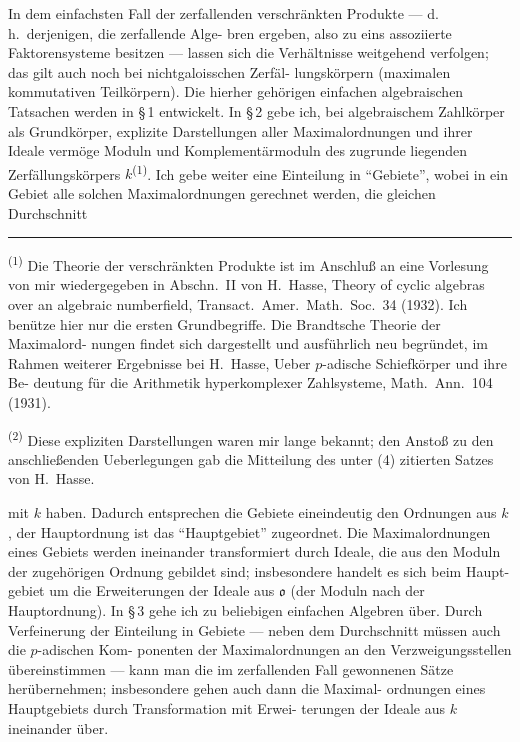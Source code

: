 \documentclass[12pt,a4paper]{article}
\theoremstyle{plain}
\begin{document}
\medskip

In dem einfachsten Fall der zerfallenden verschr\"ankten
Produkte --- d.\,h.\ derjenigen, die zerfallende Alge-
bren ergeben, also zu eins assoziierte Faktorensysteme
besitzen --- lassen sich die Verh\"altnisse weitgehend
verfolgen; das gilt auch noch bei nichtgaloisschen Zerf\"al-
lungsk\"orpern (maximalen kommutativen Teilk\"orpern). Die hierher
geh\"origen einfachen algebraischen Tatsachen werden in \S\,1
entwickelt. In \S\,2 gebe ich, bei algebraischem Zahlk\"orper als
Grundk\"orper, explizite Darstellungen aller Maximalordnungen und
ihrer Ideale verm\"oge Moduln und Komplement\"armoduln des
zugrunde liegenden Zerf\"allungsk\"orpers $k$\textsuperscript{(1)}. Ich gebe weiter eine
Einteilung in ``Gebiete'', wobei in ein Gebiet alle solchen
Maximalordnungen gerechnet werden, die gleichen Durchschnitt

\bigskip
\noindent\rule{0.3\textwidth}{0.4pt}

{\small
\textsuperscript{(1)} Die Theorie der verschr\"ankten Produkte ist im Anschlu\ss{} an eine Vorlesung
von mir wiedergegeben in Abschn.\ II von H.~Hasse, Theory of cyclic algebras
over an algebraic numberfield, Transact.\ Amer.\ Math.\ Soc.\ 34 (1932). Ich ben\"utze
hier nur die ersten Grundbegriffe. Die Brandtsche Theorie der Maximalord-
nungen findet sich dargestellt und ausf\"uhrlich neu begr\"undet, im Rahmen
weiterer Ergebnisse bei H.~Hasse, Ueber $p$-adische Schiefk\"orper und ihre Be-
deutung f\"ur die Arithmetik hyperkomplexer Zahlsysteme, Math.\ Ann.\ 104 (1931).

\textsuperscript{(2)} Diese expliziten Darstellungen waren mir lange bekannt; den Ansto\ss{} zu
den anschlie\ss enden Ueberlegungen gab die Mitteilung des unter (4) zitierten
Satzes von H.~Hasse.
}

\medskip
\noindent
mit $k$ haben. Dadurch entsprechen die Gebiete eineindeutig den
Ordnungen aus $k$, der Hauptordnung ist das ``Hauptgebiet''
zugeordnet. Die Maximalordnungen eines Gebiets werden ineinander
transformiert durch Ideale, die aus den Moduln der zugeh\"origen
Ordnung gebildet sind; insbesondere handelt es sich beim Haupt-
gebiet um die Erweiterungen der Ideale aus $\mathfrak{o}$ (der Moduln
nach der Hauptordnung). In \S\,3 gehe ich zu beliebigen einfachen
Algebren \"uber. Durch Verfeinerung der Einteilung in Gebiete
--- neben dem Durchschnitt m\"ussen auch die $p$-adischen Kom-
ponenten der Maximalordnungen an den Verzweigungsstellen
\"ubereinstimmen --- kann man die im zerfallenden Fall gewonnenen
S\"atze her\"ubernehmen; insbesondere gehen auch dann die Maximal-
ordnungen eines Hauptgebiets durch Transformation mit Erwei-
terungen der Ideale aus $k$ ineinander \"uber.
\end{document}

